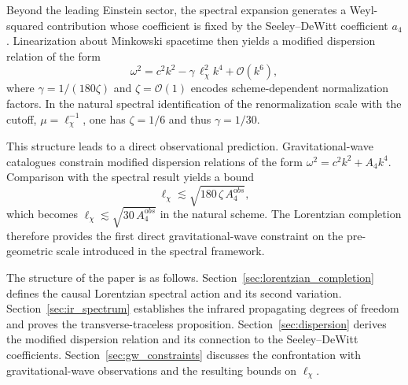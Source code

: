   Beyond the leading Einstein sector, the spectral expansion generates a
  Weyl-squared contribution whose coefficient is fixed by the
  Seeley--DeWitt coefficient $a_4$.
  Linearization about Minkowski spacetime then yields a modified
  dispersion relation of the form
  \[
    \omega^2
    =
    c^2 k^2
    -
    \gamma\, \ell_\chi^2 k^4
    +
    \mathcal{O}(k^6),
  \]
  where $\gamma = 1/(180\zeta)$ and
  $\zeta = \mathcal{O}(1)$ encodes scheme-dependent normalization
  factors.
  In the natural spectral identification of the renormalization scale
  with the cutoff, $\mu=\ell_\chi^{-1}$, one has $\zeta=1/6$ and thus
  $\gamma=1/30$.

  This structure leads to a direct observational prediction.
  Gravitational-wave catalogues constrain modified dispersion relations
  of the form $\omega^2 = c^2 k^2 + A_4 k^4$.
  Comparison with the spectral result yields a bound
  \[
    \ell_\chi
    \lesssim
    \sqrt{180\,\zeta\,A_4^{\mathrm obs}},
  \]
  which becomes
  $\ell_\chi \lesssim \sqrt{30\,A_4^{\mathrm obs}}$
  in the natural scheme.
  The Lorentzian completion therefore provides the first direct
  gravitational-wave constraint on the pre-geometric scale introduced in
  the spectral framework.

  The structure of the paper is as follows.
  Section~\ref{sec:lorentzian_completion} defines the causal Lorentzian
  spectral action and its second variation.
  Section~\ref{sec:ir_spectrum} establishes the infrared propagating
  degrees of freedom and proves the transverse-traceless proposition.
  Section~\ref{sec:dispersion} derives the modified dispersion relation
  and its connection to the Seeley--DeWitt coefficients.
  Section~\ref{sec:gw_constraints} discusses the confrontation with
  gravitational-wave observations and the resulting bounds on
  $\ell_\chi$.
